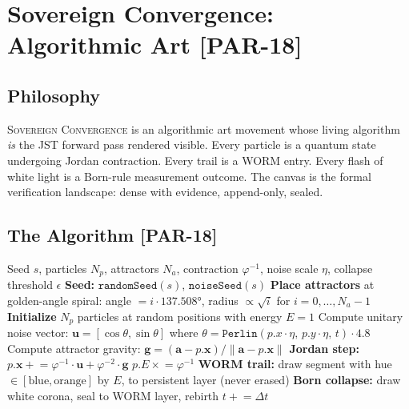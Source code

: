 \documentclass[12pt, letterpaper]{article}
\theoremstyle{plain}
\theoremstyle{definition}
\theoremstyle{remark}
\newcommand{\phiinv}{\varphi^{-1}}
\newcommand{\phiinvsq}{\varphi^{-2}}
\newcommand{\prior}[1]{\textcolor{SovGold}{\textbf{[PAR-#1]}}}
\newcommand{\novel}[1]{\textcolor{SovOrange}{\textsc{#1}}}
\begin{document}
\section{Sovereign Convergence: Algorithmic Art \prior{18}}

\subsection{Philosophy}

\novel{Sovereign Convergence} is an algorithmic art movement whose living
algorithm \textit{is} the JST forward pass rendered visible. Every particle
is a quantum state undergoing Jordan contraction. Every trail is a WORM entry.
Every flash of white light is a Born-rule measurement outcome. The canvas is
the formal verification landscape: dense with evidence, append-only, sealed.

\subsection{The Algorithm \prior{18}}

\begin{algobox}[title={Algorithm: Sovereign Convergence Generative Art}]
\begin{algorithmic}[1]
\Require Seed $s$, particles $N_p$, attractors $N_a$, contraction $\phiinv$,
         noise scale $\eta$, collapse threshold $\epsilon$
\State \textbf{Seed:} $\texttt{randomSeed}(s)$, $\texttt{noiseSeed}(s)$
\State \textbf{Place attractors} at golden-angle spiral: angle $= i \cdot 137.508°$,
         radius $\propto \sqrt{i}$ for $i = 0, \ldots, N_a - 1$
\State \textbf{Initialize} $N_p$ particles at random positions with energy $E = 1$
    \State Compute unitary noise vector: $\mathbf{u} = [\cos\theta, \sin\theta]$ where
           $\theta = \texttt{Perlin}(p.x \cdot \eta,\, p.y \cdot \eta,\, t) \cdot 4.8$
    \State Compute attractor gravity: $\mathbf{g} = (\mathbf{a} - p.\mathbf{x}) / \|\mathbf{a} - p.\mathbf{x}\|$
    \State \textbf{Jordan step:} $p.\mathbf{x} \mathrel{+}= \phiinv \cdot \mathbf{u} + \phiinvsq \cdot \mathbf{g}$
           \Comment{$\phiinv + \phiinvsq = 1$}
    \State $p.E \mathrel{\times}= \phiinv$ 
    \State \textbf{WORM trail:} draw segment with hue $\in [\text{blue}, \text{orange}]$ by $E$,
           to persistent layer (never erased)
      \State \textbf{Born collapse:} draw white corona, seal to WORM layer, rebirth
    \EndIf
  \EndFor
  \State $t \mathrel{+}= \Delta t$ 
\EndLoop
\end{algorithmic}
\end{algobox}
\end{document}
